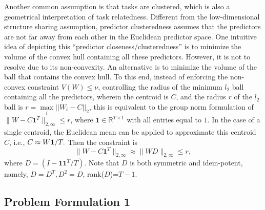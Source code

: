 \documentclass{article}
\newcounter{lem_counter}
\newcounter{pro_counter}
\newcounter{ass_counter}
\begin{document}
Another common assumption is that tasks are clustered, which is also a geometrical interpretation of task relatedness.
Different from the low-dimensional structure sharing assumption, predictor
clusteredness assumes that the predictors are not far away from each
other in the Euclidean predictor space. One intuitive idea of depicting
this ``predictor closeness/clusteredness'' is to minimize the volume
of the convex hull containing all these predictors. However, it is not
to resolve due to its non-convexity. 
An alternative is to minimize the volume of the ball that contains
the convex hull. To this end, instead of enforcing the non-convex constraint
$V(W)\leq\nu$, controlling the radius of the minimum $l_{2}$
ball containing all the predictors, wherein the centroid is $C$,
and the radius $r$ of the $l_{2}$ ball is $r = \mathop {\max }\limits_i ||{W_i} - C|{|_2}$,
this is equivalent to the group norm formulation of $\|W-C\mathbf{1}^{T}\|_{2,\infty}\leq r$,
where $\mathbf{1} \in \mathbb{R}^{T \times 1}$ with all entries
equal to $1$.  In the case of a single centroid, the Euclidean
mean can be applied to approximate this centroid $C$, i.e., 
$
C \approx W{\bf{1}}/T.
$
 Then the constraint is 
\begin{equation}
\|W-C\mathbf{1}^{T}\|_{2,\infty}\approx\|WD\|_{2,\infty}\leq r,
\end{equation}
where $D=(I-\boldsymbol{11}^{T}/T)$. Note that $D$ is both symmetric and idem-potent, namely, $D=D^{T},D^{2}=D$,
rank($D$)=$T-1$.  


\subsection{Problem Formulation 1}
\end{document}
